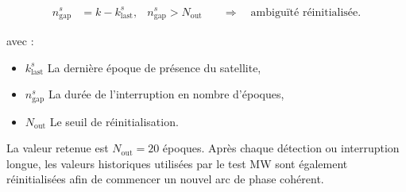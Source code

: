 \begin{align}
n_{\mathrm{gap}}^s
&=k-k_{\mathrm{last}}^s,
&
n_{\mathrm{gap}}^s>N_{\mathrm{out}}
&\quad\Longrightarrow\quad
\text{ambiguïté réinitialisée}.
\label{ann:eq:outage_reset}
\end{align}

avec :

\begin{itemize}
    \item $k_{\mathrm{last}}^s$ La dernière époque de présence du satellite,
    \item $n_{\mathrm{gap}}^s$ La durée de l'interruption en nombre d'époques,
    \item $N_{\mathrm{out}}$ Le seuil de réinitialisation.
\end{itemize}

La valeur retenue est $N_{\mathrm{out}}=20$ époques. Après chaque détection ou
interruption longue, les valeurs historiques utilisées par le test MW sont
également réinitialisées afin de commencer un nouvel arc de phase cohérent.
